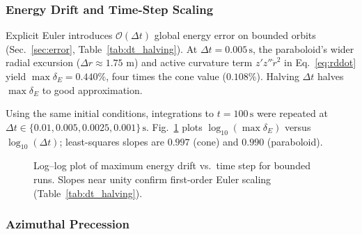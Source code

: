 \documentclass[11pt,letterpaper]{article}
\begin{document}
\subsubsection{Energy Drift and Time-Step Scaling}
\label{sec:dt_scaling}

Explicit Euler introduces $\mathcal{O}(\Delta t)$ global energy error on bounded orbits (Sec.~\ref{sec:error}, Table~\ref{tab:dt_halving}). At $\Delta t=0.005\,\mathrm{s}$, the paraboloid's wider radial excursion ($\Delta r\approx 1.75$ m) and active curvature term $z'z''\dot{r}^2$ in Eq.~\eqref{eq:rddot} yield $\max\delta_E=0.440\%$, four times the cone value ($0.108\%$). Halving $\Delta t$ halves $\max\delta_E$ to good approximation.

Using the same initial conditions, integrations to $t=100\,\mathrm{s}$ were repeated at $\Delta t\in\{0.01,0.005,0.0025,0.001\}\,\mathrm{s}$. Fig.~\ref{fig:dt_scaling} plots $\log_{10}(\max\delta_E)$ versus $\log_{10}(\Delta t)$; least-squares slopes are $0.997$ (cone) and $0.990$ (paraboloid).

\begin{figure}[htbp]
  \centering
  \caption{Log--log plot of maximum energy drift vs.\ time step for bounded runs. Slopes near unity confirm first-order Euler scaling (Table~\ref{tab:dt_halving}).}
  \label{fig:dt_scaling}
\end{figure}

\subsubsection{Azimuthal Precession}
\label{sec:azimuth}
\end{document}
